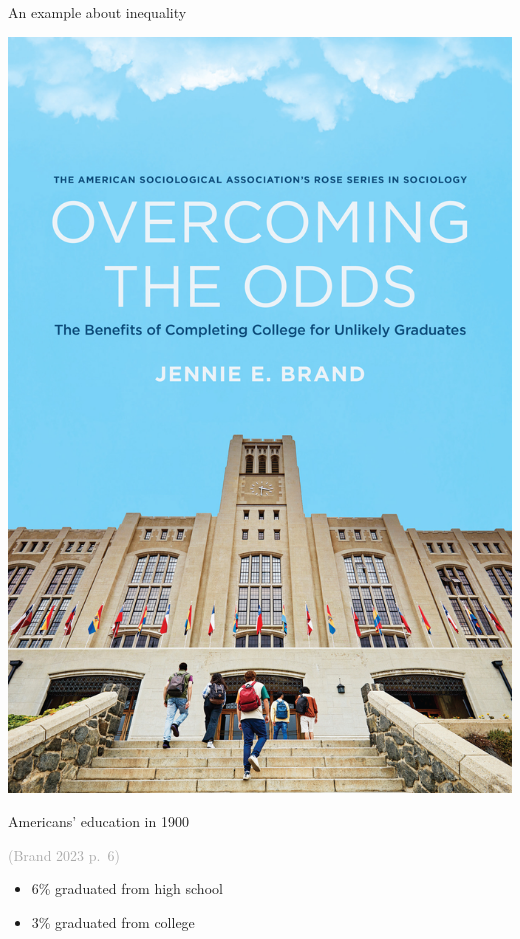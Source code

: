 \documentclass{beamer}
\newcommand\mycite[1]{\begin{scriptsize}\textcolor{darkgray}{(#1)}\end{scriptsize}}
\begin{document}
\begin{frame}{An example about inequality}

\includegraphics[height = .8\textheight]{figures/brand_cover}

\end{frame}

\begin{frame}

Americans' education in 1900\hfill \mycite{Brand 2023 p.~6}
\begin{itemize}
\item 6\% graduated from high school
\item 3\% graduated from college
\end{itemize}

\end{frame}
\end{document}
